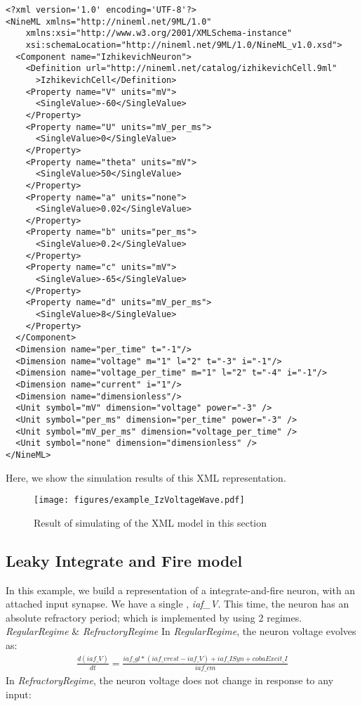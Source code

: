\documentclass[draftspec]{ninemlspec}
\newcommand{\StateVariable}{\defRef{\textbf{\class{StateVariable}}\xspace}{sec:StateVariable}}
\begin{document}
\begin{lstlisting}
<?xml version='1.0' encoding='UTF-8'?>
<NineML xmlns="http://nineml.net/9ML/1.0"
    xmlns:xsi="http://www.w3.org/2001/XMLSchema-instance"
    xsi:schemaLocation="http://nineml.net/9ML/1.0/NineML_v1.0.xsd">
  <Component name="IzhikevichNeuron">
    <Definition url="http://nineml.net/catalog/izhikevichCell.9ml"
      >IzhikevichCell</Definition>
    <Property name="V" units="mV">
      <SingleValue>-60</SingleValue>
    </Property>
    <Property name="U" units="mV_per_ms">
      <SingleValue>0</SingleValue>
    </Property>
    <Property name="theta" units="mV">
      <SingleValue>50</SingleValue>
    </Property>
    <Property name="a" units="none">
      <SingleValue>0.02</SingleValue>
    </Property>
    <Property name="b" units="per_ms">
      <SingleValue>0.2</SingleValue>
    </Property>
    <Property name="c" units="mV">
      <SingleValue>-65</SingleValue>
    </Property>
    <Property name="d" units="mV_per_ms">
      <SingleValue>8</SingleValue>
    </Property>
  </Component>
  <Dimension name="per_time" t="-1"/>
  <Dimension name="voltage" m="1" l="2" t="-3" i="-1"/>
  <Dimension name="voltage_per_time" m="1" l="2" t="-4" i="-1"/>
  <Dimension name="current" i="1"/>
  <Dimension name="dimensionless"/>
  <Unit symbol="mV" dimension="voltage" power="-3" />
  <Unit symbol="per_ms" dimension="per_time" power="-3" />
  <Unit symbol="mV_per_ms" dimension="voltage_per_time" />
  <Unit symbol="none" dimension="dimensionless" />
</NineML>
\end{lstlisting}

Here, we show the simulation results of this XML representation.
\begin{figure}[htb!]
\center
\texttt{[image: figures/example\_IzVoltageWave.pdf]}
\protect\caption{Result of simulating of the XML model in
this section}
\label{fig:Ex1_Output}
\end{figure}

\newpage
\subsection{Leaky Integrate and Fire model}

In this example, we build a representation of a integrate-and-fire neuron, with
an attached input synapse.
\noindent
We have a single \StateVariable, \emph{iaf\_V}.
This time, the neuron has an absolute refractory period; which is implemented
by using 2 regimes. \emph{RegularRegime} \& \emph{RefractoryRegime}
In \emph{RegularRegime}, the neuron voltage evolves as:
\begin{eqnarray}
\frac{d(iaf\_V)}{dt} = \frac{ iaf\_gl*( iaf\_vrest - iaf\_V ) + iaf\_ISyn+cobaExcit\_I} {iaf\_cm}
\end{eqnarray}
In \emph{RefractoryRegime}, the neuron voltage does not change in response to any
input:
\end{document}

